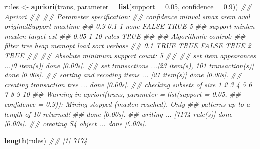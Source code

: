 \documentclass[
  notitlepage]{book}
\newenvironment{Shaded}{\begin{snugshade}}{\end{snugshade}}
\newcommand{\CommentTok}[1]{\textcolor[rgb]{0.56,0.35,0.01}{\textit{#1}}}
\newcommand{\DataTypeTok}[1]{\textcolor[rgb]{0.13,0.29,0.53}{#1}}
\newcommand{\FloatTok}[1]{\textcolor[rgb]{0.00,0.00,0.81}{#1}}
\newcommand{\KeywordTok}[1]{\textcolor[rgb]{0.13,0.29,0.53}{\textbf{#1}}}
\newcommand{\NormalTok}[1]{#1}
\newcommand{\StringTok}[1]{\textcolor[rgb]{0.31,0.60,0.02}{#1}}
\begin{document}
\begin{Shaded}
\begin{Highlighting}[]
\NormalTok{rules \textless{}{-}}\StringTok{ }\KeywordTok{apriori}\NormalTok{(trans, }
                 \DataTypeTok{parameter =} \KeywordTok{list}\NormalTok{(}\DataTypeTok{support =} \FloatTok{0.05}\NormalTok{, }
                                         \DataTypeTok{confidence =} \FloatTok{0.9}\NormalTok{))}
\CommentTok{\#\# Apriori}
\CommentTok{\#\# }
\CommentTok{\#\# Parameter specification:}
\CommentTok{\#\#  confidence minval smax arem  aval originalSupport maxtime}
\CommentTok{\#\#         0.9    0.1    1 none FALSE            TRUE       5}
\CommentTok{\#\#  support minlen maxlen target  ext}
\CommentTok{\#\#     0.05      1     10  rules TRUE}
\CommentTok{\#\# }
\CommentTok{\#\# Algorithmic control:}
\CommentTok{\#\#  filter tree heap memopt load sort verbose}
\CommentTok{\#\#     0.1 TRUE TRUE  FALSE TRUE    2    TRUE}
\CommentTok{\#\# }
\CommentTok{\#\# Absolute minimum support count: 5 }
\CommentTok{\#\# }
\CommentTok{\#\# set item appearances ...[0 item(s)] done [0.00s].}
\CommentTok{\#\# set transactions ...[23 item(s), 101 transaction(s)] done [0.00s].}
\CommentTok{\#\# sorting and recoding items ... [21 item(s)] done [0.00s].}
\CommentTok{\#\# creating transaction tree ... done [0.00s].}
\CommentTok{\#\# checking subsets of size 1 2 3 4 5 6 7 8 9 10}
\CommentTok{\#\# Warning in apriori(trans, parameter = list(support = 0.05,}
\CommentTok{\#\# confidence = 0.9)): Mining stopped (maxlen reached). Only}
\CommentTok{\#\# patterns up to a length of 10 returned!}
\CommentTok{\#\#  done [0.00s].}
\CommentTok{\#\# writing ... [7174 rule(s)] done [0.00s].}
\CommentTok{\#\# creating S4 object  ... done [0.00s].}
\end{Highlighting}
\end{Shaded}

\begin{Shaded}
\begin{Highlighting}[]
\KeywordTok{length}\NormalTok{(rules)}
\CommentTok{\#\# [1] 7174}
\end{Highlighting}
\end{Shaded}
\end{document}
